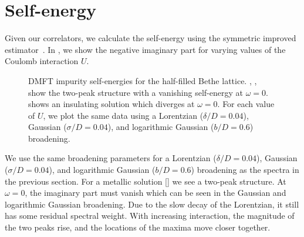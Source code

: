\section{Self-energy}

Given our correlators,
we calculate the self-energy using the symmetric improved estimator~\cite{Kugler2022}.
In , we show the negative imaginary part for varying values of
the Coulomb interaction $U$.
\begin{figure}[ht]
    \centering
    
    \caption{
        DMFT impurity self-energies for the half-filled Bethe lattice.
        ,
        ,
        show the two-peak structure with a vanishing self-energy at $\omega=0$.
        shows an insulating solution which diverges at $\omega=0$.
        For each value of $U$,
        we plot the same data using a
        Lorentzian ($\delta/D=0.04$),
        Gaussian ($\sigma/D=0.04$),
        and logarithmic Gaussian ($b/D=0.6$)
        broadening.
    }%
    \label{fig:self-energy}
\end{figure}
We use the same broadening parameters for a
Lorentzian ($\delta/D=0.04$),
Gaussian ($\sigma/D=0.04$),
and logarithmic Gaussian ($b/D=0.6$) broadening
as the spectra in the previous section.
For a metallic solution
    []
we see a two-peak structure.
At $\omega=0$, the imaginary part must vanish which can be seen in the Gaussian
and logarithmic Gaussian broadening.
Due to the slow decay of the Lorentzian, it still has some residual spectral weight.
With increasing interaction, the magnitude of the two peaks rise,
and the locations of the maxima move closer together.

